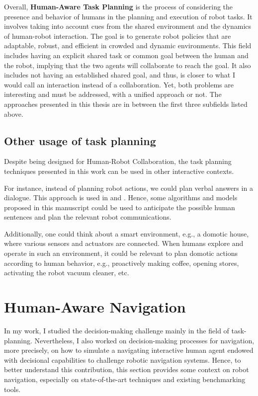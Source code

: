 Overall, \textbf{Human-Aware Task Planning} is the process of considering the presence and behavior of humans in the planning and execution of robot tasks. It involves taking into account cues from the shared environment and the dynamics of human-robot interaction. The goal is to generate robot policies that are adaptable, robust, and efficient in crowded and dynamic environments. This field includes having an explicit shared task or common goal between the human and the robot, implying that the two agents will collaborate to reach the goal. It also includes not having an established shared goal, and thus, is closer to what I would call an interaction instead of a collaboration. Yet, both problems are interesting and must be addressed, with a unified approach or not. 
The approaches presented in this thesis are in between the first three subfields listed above. 

\subsection{Other usage of task planning}

Despite being designed for Human-Robot Collaboration, the task planning techniques presented in this work can be used in other interactive contexts. 

For instance, instead of planning robot actions, we could plan verbal answers in a dialogue. 
This approach is used in \cite{de_carolis_verbal_2000} and \cite{de_carolis_behavior_2001}.
Hence, some algorithms and models proposed in this manuscript could be used to anticipate the possible human sentences and plan the relevant robot communications. 

Additionally, one could think about a smart environment, e.g., a domotic house, where various sensors and actuators are connected. When humans explore and operate in such an environment, it could be relevant to plan domotic actions according to human behavior, e.g., proactively making coffee, opening stores, activating the robot vacuum cleaner, etc.


\section{Human-Aware Navigation}

In my work, I studied the decision-making challenge mainly in the field of task-planning. 
Nevertheless, I also worked on decision-making processes for navigation, more precisely, on how to simulate a navigating interactive human agent endowed with decisional capabilities to challenge robotic navigation systems. Hence, to better understand this contribution, this section provides some context on robot navigation, especially on state-of-the-art techniques and existing benchmarking tools.

